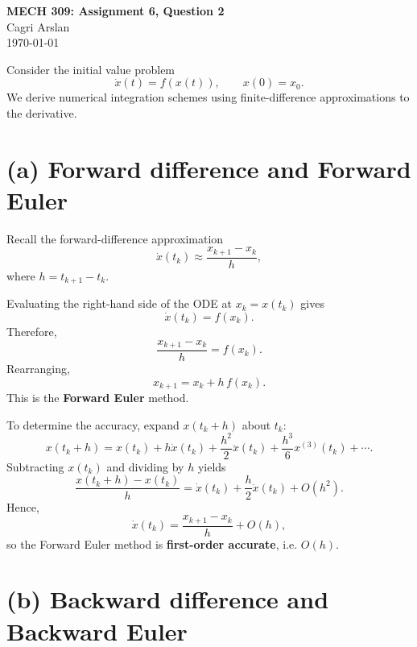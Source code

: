 \documentclass[11pt]{article}
\begin{document}
\begin{center}
{\Large \textbf{MECH 309: Assignment 6, Question 2}}\\
Cagri Arslan\\
\today
\end{center}

Consider the initial value problem
\begin{equation}
\dot{x}(t)=f(x(t)), \qquad x(0)=x_0.
\end{equation}
We derive numerical integration schemes using finite-difference approximations to the derivative.

\section*{(a) Forward difference and Forward Euler}

Recall the forward-difference approximation
\begin{equation}
\dot{x}(t_k) \approx \frac{x_{k+1}-x_k}{h},
\end{equation}
where $h=t_{k+1}-t_k$.

Evaluating the right-hand side of the ODE at $x_k=x(t_k)$ gives
\begin{equation}
\dot{x}(t_k)=f(x_k).
\end{equation}
Therefore,
\begin{equation}
\frac{x_{k+1}-x_k}{h}=f(x_k).
\end{equation}
Rearranging,
\begin{equation}
\boxed{x_{k+1}=x_k+h\,f(x_k).}
\end{equation}
This is the \textbf{Forward Euler} method.

To determine the accuracy, expand $x(t_k+h)$ about $t_k$:
\begin{equation}
x(t_k+h)=x(t_k)+h\dot{x}(t_k)+\frac{h^2}{2}\ddot{x}(t_k)+\frac{h^3}{6}x^{(3)}(t_k)+\cdots.
\end{equation}
Subtracting $x(t_k)$ and dividing by $h$ yields
\begin{equation}
\frac{x(t_k+h)-x(t_k)}{h}=\dot{x}(t_k)+\frac{h}{2}\ddot{x}(t_k)+O(h^2).
\end{equation}
Hence,
\begin{equation}
\dot{x}(t_k)=\frac{x_{k+1}-x_k}{h}+O(h),
\end{equation}
so the Forward Euler method is \textbf{first-order accurate}, i.e. \(O(h)\).

\section*{(b) Backward difference and Backward Euler}
\end{document}
